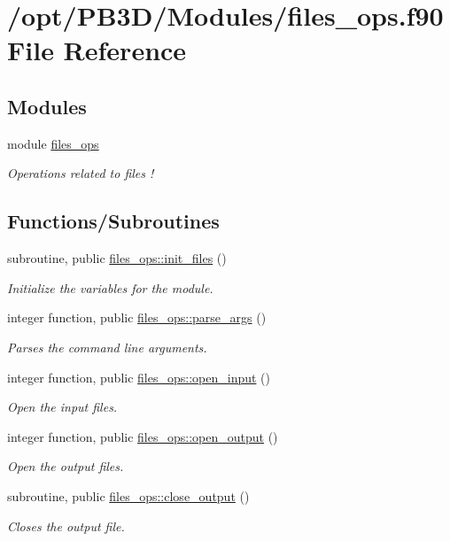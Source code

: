 \hypertarget{files__ops_8f90}{}\section{/opt/\+P\+B3\+D/\+Modules/files\+\_\+ops.f90 File Reference}
\label{files__ops_8f90}
\subsection*{Modules}
\begin{DoxyCompactItemize}
\item 
module \hyperlink{namespacefiles__ops}{files\+\_\+ops}
\begin{DoxyCompactList}\small\item\em Operations related to files ! \end{DoxyCompactList}\end{DoxyCompactItemize}
\subsection*{Functions/\+Subroutines}
\begin{DoxyCompactItemize}
\item 
subroutine, public \hyperlink{namespacefiles__ops_a1e219b1147f109f758d03bef89d540e8}{files\+\_\+ops\+::init\+\_\+files} ()
\begin{DoxyCompactList}\small\item\em Initialize the variables for the module. \end{DoxyCompactList}\item 
integer function, public \hyperlink{namespacefiles__ops_a051584112f6e4f6e60b0ef824dffbf5e}{files\+\_\+ops\+::parse\+\_\+args} ()
\begin{DoxyCompactList}\small\item\em Parses the command line arguments. \end{DoxyCompactList}\item 
integer function, public \hyperlink{namespacefiles__ops_a63a81a5a451f787025429878b2cec81b}{files\+\_\+ops\+::open\+\_\+input} ()
\begin{DoxyCompactList}\small\item\em Open the input files. \end{DoxyCompactList}\item 
integer function, public \hyperlink{namespacefiles__ops_ad681a9e8083a6f664cf0f9d17ebe279c}{files\+\_\+ops\+::open\+\_\+output} ()
\begin{DoxyCompactList}\small\item\em Open the output files. \end{DoxyCompactList}\item 
subroutine, public \hyperlink{namespacefiles__ops_a239cc017150e54eda19a8ccb0ff191cd}{files\+\_\+ops\+::close\+\_\+output} ()
\begin{DoxyCompactList}\small\item\em Closes the output file. \end{DoxyCompactList}\end{DoxyCompactItemize}
